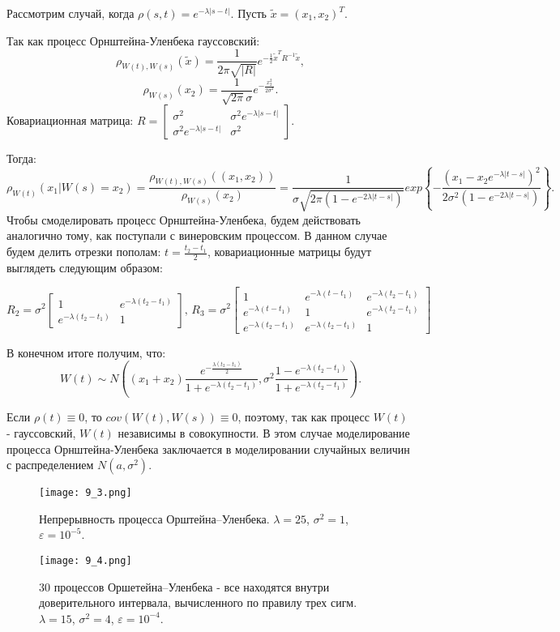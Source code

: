 \documentclass[a4paper, 11pt]{article}
\theoremstyle{def}
\theoremstyle{th}
\theoremstyle{rem}
\begin{document}
Рассмотрим случай, когда $\rho(s, t) = e^{-\lambda |s-t|}$. Пусть $\tilde{x} = (x_1, x_2)^T$.

Так как процесс Орнштейна-Уленбека гауссовский:
$$
\rho_{W(t), W(s)}(\tilde{x}) = \frac{1}{2\pi\sqrt{|R|}} e^{-\frac{1}{2} \tilde{x}^T R^{-1} \tilde{x}},
$$
$$
\rho_{W(s)}(x_2) = \frac{1}{\sqrt{2\pi}\sigma}e^{-\frac{x_2^2}{2\sigma^2}}.
$$
Ковариационная матрица:
$R = \begin{bmatrix} \sigma^2& \sigma^2 e^{-\lambda |s-t|}\\ \sigma^2 e^{-\lambda |s-t|}& \sigma^2 \end{bmatrix}.$

Тогда:
$$
\rho_{W(t)}(x_1|W(s) = x_2) = \frac{\rho_{W(t), W(s)}((x_1, x_2))}{\rho_{W(s)}(x_2)}= \frac{1}{\sigma\sqrt{2\pi\left(1 - e^{-2\lambda|t-s|}\right)}}exp\left\{-\frac{\left(x_1 - x_2 e^{-\lambda |t-s|}\right)^2}{2\sigma^2\left(1 - e^{-2\lambda|t-s|}\right)}\right\}.
$$
Чтобы смоделировать процесс Орнштейна-Уленбека, будем действовать аналогично тому, как поступали с винеровским процессом. В данном случае будем делить отрезки пополам: $t = \frac{t_2-t_1}{2}$, ковариационные матрицы будут выглядеть следующим образом:

$R_2 = \sigma^2\begin{bmatrix} 1& e^{-\lambda(t_2-t_1)}\\ e^{-\lambda(t_2-t_1)}& 1 \end{bmatrix}, \, R_3 = \sigma^2\begin{bmatrix} 1& e^{-\lambda(t-t_1)}& e^{-\lambda(t_2-t_1)}\\ e^{-\lambda(t-t_1)}& 1& e^{-\lambda(t_2-t_1)}\\ e^{-\lambda(t_2-t_1)}& e^{-\lambda(t_2-t_1)}& 1 \end{bmatrix}$

В конечном итоге получим, что:
$$
W(t) \sim N\left((x_1 + x_2)\frac{e^{-\frac{\lambda(t_2-t_1)}{2}}}{1 + e^{-\lambda(t_2-t_1)}}, \sigma^2\frac{1-e^{-\lambda(t_2-t_1)}}{1+e^{-\lambda(t_2-t_1)}}\right).
$$

Если $\rho(t) \equiv 0$, то $cov(W(t), W(s)) \equiv 0$, поэтому, так как процесс $W(t)$ - гауссовский, $W(t)$ независимы в совокупности. В этом случае моделирование процесса Орнштейна-Уленбека заключается в моделировании случайных величин с распределением $N(a, \sigma^2).$

\begin{figure}[H]
        \noindent
        \centering
        {
                \texttt{[image: 9\_3.png]}
        }
        \caption{Непрерывность процесса Орштейна--Уленбека. $\lambda = 25$, $\sigma^2 = 1$, $\varepsilon = 10^{-5}$.}
\end{figure}
\begin{figure}[H]
        \noindent
        \centering
        {
                \texttt{[image: 9\_4.png]}
        }
        \caption{30 процессов Оршетейна--Уленбека - все находятся внутри доверительного интервала, вычисленного по правилу трех сигм. $\lambda = 15$, $\sigma^2 = 4$, $\varepsilon = 10^{-4}$.}
\end{figure}
\end{document}

